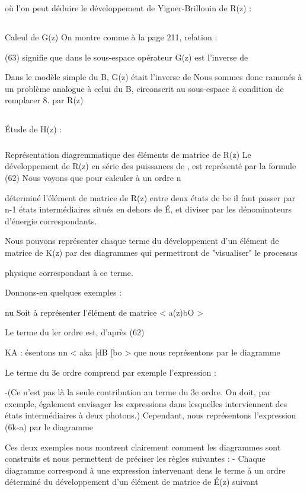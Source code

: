 où l'on peut déduire le développement de Yigner-Brillouin de R(z) :

\subsection{} Caleul de G(z)%
On montre comme à la page 211, relation :

(63) signifie que dans le sous-espace  opérateur G(z) est l'inverse de

Dans le modèle simple du  B, G(z) était l'inverse de
Nous sommes donc ramenés à un problème analogue à celui du  B, circonscrit
au sous-espace à condition de remplacer 8. par R(z)
\subsection{} Étude de H(z) :%
\subsubsection{} Représentation diagremmatique des éléments de matrice
de R(z)%
Le développement de R(z) en série des puissances de ,
est représenté par la formule (62) Nous voyons que pour calculer à un ordre n

déterminé l'élément de matrice de R(z) entre deux états de be il faut passer
par n-1 états intermédiaires situés en dehors de É, et diviser par les dénominateurs d'énergie correspondants.

Nous pouvons représenter chaque terme du développement d'un élément
de matrice de K(z) par des diagrammes qui permettront de "visualiser" le processus

physique correspondant à ce terme.

Donnons-en quelques exemples :

nu
Soit à représenter l'élément de matrice < a(z)bO >

Le terme du ler ordre est, d'après (62)

KA
: ésentons nn
< aka [dB [bo > que nous représentons par le diagramme

Le terme du 3e ordre comprend par exemple l'expression :

-(Ce n'est pas là la seule contribution au terme du 3e ordre.
On doit, par exemple, également envisager les expressions dans lesquelles
interviennent des états intermédiaires à deux photons.)
Cependant, nous représentons l'expression (6k-a) par le diagramme

Ces deux exemples nous montrent clairement comment les diagrammes sont construits et nous permettent de préciser les règles suivantes :
- Chaque diagramme correspond à une expression intervenant dens le terme à un
ordre déterminé du développement d'un élément de matrice de É(z) suivant

